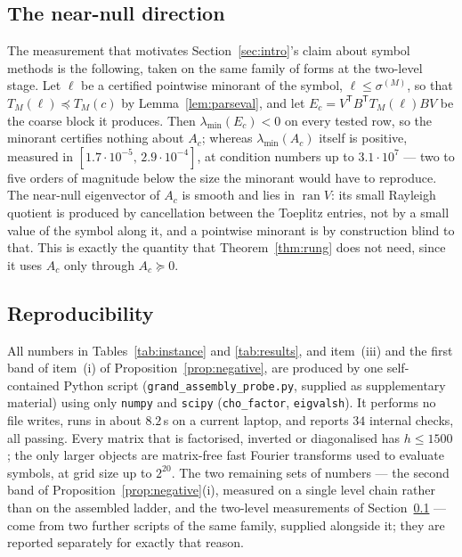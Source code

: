 \documentclass[11pt,a4paper]{article}
\theoremstyle{plain}
\theoremstyle{definition}
\newcommand{\T}{\mathsf{T}}
\newcommand{\Tm}[1]{T_{#1}}
\newcommand{\lmin}{\lambda_{\min}}
\newcommand{\ran}{\operatorname{ran}}
\newcommand{\PSD}{\succeq 0}
\begin{document}
\subsection{The near-null direction}
\label{sec:nearnull}

The measurement that motivates Section~\ref{sec:intro}'s claim about symbol methods is
the following, taken on the same family of forms at the two-level stage. Let $\ell$ be
a certified pointwise minorant of the symbol, $\ell\le\sigma^{(M)}$, so that
$\Tm{M}(\ell)\preceq\Tm{M}(c)$ by Lemma~\ref{lem:parseval}, and let
$E_{c}=V^{\T}B^{\T}\Tm{M}(\ell)BV$ be the coarse block it produces. Then
$\lmin(E_{c})<0$ on every tested row, so the minorant certifies nothing about
$A_{c}$; whereas $\lmin(A_{c})$ itself is positive, measured in
$[1.7\cdot10^{-5},\,2.9\cdot10^{-4}]$, at condition numbers up to
$3.1\cdot10^{7}$ --- two to five orders of magnitude below the size the minorant
would have to reproduce. The near-null eigenvector of $A_{c}$ is smooth and lies in
$\ran V$: its small Rayleigh quotient is produced by cancellation between the
Toeplitz entries, not by a small value of the symbol along it, and a pointwise
minorant is by construction blind to that. This is exactly the quantity that
Theorem~\ref{thm:rung} does not need, since it uses $A_{c}$ only through
$A_{c}\PSD$.

\subsection{Reproducibility}
\label{sec:repro}

All numbers in Tables~\ref{tab:instance} and \ref{tab:results}, and item~(iii) and the
first band of item~(i) of Proposition~\ref{prop:negative}, are produced by one
self-contained Python script (\texttt{grand\_assembly\_probe.py}, supplied as
supplementary material) using only \texttt{numpy} and \texttt{scipy}
(\texttt{cho\_factor}, \texttt{eigvalsh}). It performs no file writes, runs in about
$8.2$\,s on a current laptop, and reports $34$ internal checks, all passing. Every
matrix that is factorised, inverted or diagonalised has $h\le1500$; the only larger
objects are matrix-free fast Fourier transforms used to evaluate symbols, at grid
size up to $2^{20}$. The two remaining sets of numbers --- the second band of
Proposition~\ref{prop:negative}(i), measured on a single level chain rather than on
the assembled ladder, and the two-level measurements of
Section~\ref{sec:nearnull} --- come from two further scripts of the same family,
supplied alongside it; they are reported separately for exactly that reason.
\end{document}

